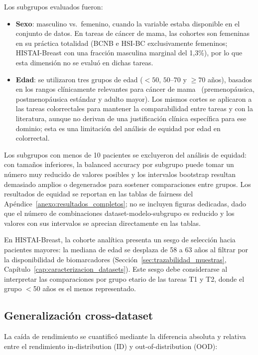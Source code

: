 Los subgrupos evaluados fueron:

\begin{itemize}
    \item \textbf{Sexo}: masculino vs.\ femenino, cuando la variable estaba disponible en el conjunto de datos. En tareas de cáncer de mama, las cohortes son femeninas en su práctica totalidad (BCNB e HSI-BC exclusivamente femeninos; HISTAI-Breast con una fracción masculina marginal del 1,3\%), por lo que esta dimensión no se evaluó en dichas tareas.
    \item \textbf{Edad}: se utilizaron tres grupos de edad ($<50$, $50$--$70$ y $\geq 70$ años), basados en los rangos clínicamente relevantes para cáncer de mama~\parencite{lin2025fairpath} (premenopáusica, postmenopáusica estándar y adulto mayor). Los mismos cortes se aplicaron a las tareas colorrectales para mantener la comparabilidad entre tareas y con la literatura, aunque no derivan de una justificación clínica específica para ese dominio; esta es una limitación del análisis de equidad por edad en colorrectal.
\end{itemize}

Los subgrupos con menos de 10 pacientes se excluyeron del análisis de equidad: con tamaños inferiores, la balanced accuracy por subgrupo puede tomar un número muy reducido de valores posibles y los intervalos bootstrap resultan demasiado amplios o degenerados para sostener comparaciones entre grupos. Los resultados de equidad se reportan en las tablas de fairness del Apéndice~\ref{anexo:resultados_completos}; no se incluyen figuras dedicadas, dado que el número de combinaciones dataset-modelo-subgrupo es reducido y los valores con sus intervalos se aprecian directamente en las tablas.

En HISTAI-Breast, la cohorte analítica presenta un sesgo de selección hacia pacientes mayores: la mediana de edad se desplaza de 58 a 63 años al filtrar por la disponibilidad de biomarcadores (Sección~\ref{sec:trazabilidad_muestras}, Capítulo~\ref{cap:caracterizacion_datasets}). Este sesgo debe considerarse al interpretar las comparaciones por grupo etario de las tareas T1 y T2, donde el grupo $<$50 años es el menos representado.

\subsection{Generalización cross-dataset}
\label{sec:generalizacion}

La caída de rendimiento se cuantificó mediante la diferencia absoluta y relativa entre el rendimiento in-distribution (ID) y out-of-distribution (OOD):

